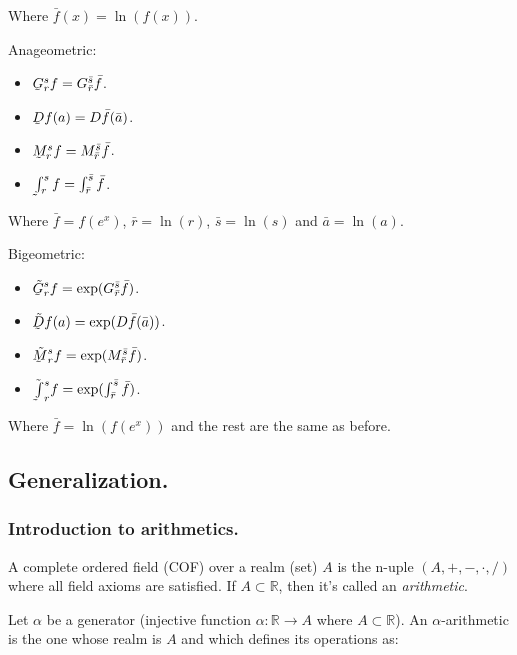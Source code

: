 Where $\bar{f}(x) = \ln(f(x))$.

Anageometric:

\begin{itemize}
	\item $\underaccent{\tilde}{G}_r^s f = G_{\bar{r}}^{\bar{s}} \bar{f}$.
	\item $\underaccent{\tilde}{D}f(a) = D\bar{f}(\bar{a})$.
	\item $\underaccent{\tilde}{M}_r^sf = M_{\bar{r}}^{\bar{s}} \bar{f}$.
	\item $\underaccent{\tilde}{\int}_r^s f = \int_{\bar{r}}^{\bar{s}} \bar{f}$.
\end{itemize}

Where $\bar{f} = f(e^x)$, $\bar{r} = \ln(r)$, $\bar{s} = \ln(s)$ and $\bar{a} = \ln(a)$.

Bigeometric:

\begin{itemize}
	\item $\tilde{\underaccent{\tilde}{G}}_r^s f = \exp(G_{\bar{r}}^{\bar{s}} \bar{f})$.
	\item $\tilde{\underaccent{\tilde}{D}}f(a) = \exp(D\bar{f}(\bar{a}))$.
	\item $\tilde{\underaccent{\tilde}{M}}_r^s f = \exp(M_{\bar{r}}^{\bar{s}} \bar{f})$.
	\item $\tilde{\underaccent{\tilde}{\int}}_r^s f = \exp(\int_{\bar{r}}^{\bar{s}} \bar{f})$.
\end{itemize}

Where $\bar{f} = \ln(f(e^x))$ and the rest are the same as before.

\subsection{Generalization.} \label{general}

\subsubsection{Introduction to arithmetics.}

A complete ordered field (COF) over a realm (set) $A$ is the n-uple $(A, +, -, \cdot, /)$ where all field axioms are satisfied. If $A \subset \mathbb{R}$, then it's called an \textit{arithmetic}.

Let $\alpha$ be a generator (injective function $\alpha: \mathbb{R} \to A$ where $A \subset \mathbb{R}$). An $\alpha$-arithmetic is the one whose realm is $A$ and which defines its operations as:

